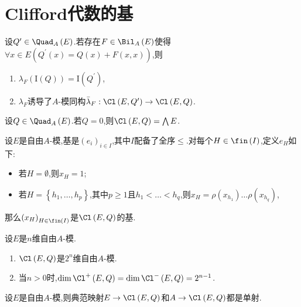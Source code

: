 \section{Clifford代数的基}

\begin{proposition}{}{}
	设$Q^{\prime}\in\Quad_{A}\left(E\right)$.若存在$F\in\Bil_{A}\left(E\right)$使得$\forall x\in E\left(Q^{\prime}\left(x\right)=Q\left(x\right)+F\left(x,x\right)\right)$,则
	\begin{enumerate}
		\item $\lambda_{F}\left(\mathrm{I}\left(Q\right)\right)=\mathrm{I}\left(Q^{\prime}\right)$,
		\item $\lambda_{F}$诱导了$A$-模同构$\bar{\lambda}_{F}:\Cl\left(E,Q^{\prime}\right)\to\Cl\left(E,Q\right)$.
	\end{enumerate}
\end{proposition}

\begin{lemma}{}{}
	设$Q\in\Quad_{A}\left(E\right)$.若$Q=0$,则$\Cl\left(E,Q\right)=\bigwedge E$.
\end{lemma}

\begin{theorem}{}{}
	设$E$是自由$A$-模,基是$\left(e_{i}\right)_{i\in I}$,其中$I$配备了全序$\leq$.对每个$H\in\fin\left(I\right)$,定义$e_{H}$如下:
	\begin{itemize}
		\item 若$H=\emptyset$,则$x_{H}=1$;
		\item 若$H=\left\{h_{1},\ldots,h_{p}\right\}$,其中$p\geq 1$且$h_{1}<\ldots<h_{q}$,则$x_{H}=\rho\left(x_{h_{1}}\right)\ldots\rho\left(x_{h_{q}}\right)$,
	\end{itemize}
	那么$\left(x_{H}\right)_{H\in\fin\left(I\right)}$是$\Cl\left(E,Q\right)$的基.
\end{theorem}

\begin{corollary}{}{}
	设$E$是$n$维自由$A$-模.
	\begin{enumerate}
		\item $\Cl\left(E,Q\right)$是$2^{n}$维自由$A$-模.
		\item 当$n>0$时,$\dim\Cl^{+}\left(E,Q\right)=\dim\Cl^{-}\left(E,Q\right)=2^{n-1}$.
	\end{enumerate}
\end{corollary}

\begin{corollary}{}{}
	设$E$是自由$A$-模,则典范映射$E\to\Cl\left(E,Q\right)$和$A\to\Cl\left(E,Q\right)$都是单射.
\end{corollary}

